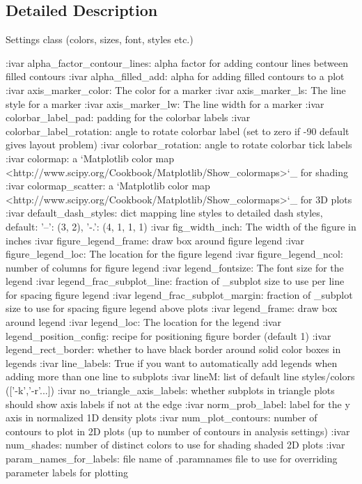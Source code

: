 \subsection{Detailed Description}
\begin{DoxyVerb}Settings class (colors, sizes, font, styles etc.)

:ivar alpha_factor_contour_lines: alpha factor for adding contour lines between filled contours
:ivar alpha_filled_add: alpha for adding filled contours to a plot
:ivar axis_marker_color: The color for a marker
:ivar axis_marker_ls: The line style for a marker
:ivar axis_marker_lw: The line width for a marker
:ivar colorbar_label_pad: padding for the colorbar labels
:ivar colorbar_label_rotation: angle to rotate colorbar label (set to zero if -90 default gives layout problem)
:ivar colorbar_rotation: angle to rotate colorbar tick labels
:ivar colormap: a `Matplotlib color map <http://www.scipy.org/Cookbook/Matplotlib/Show_colormaps>`_ for shading
:ivar colormap_scatter: a `Matplotlib color map <http://www.scipy.org/Cookbook/Matplotlib/Show_colormaps>`_ for 3D plots
:ivar default_dash_styles: dict mapping line styles to detailed dash styles, default:  {'--': (3, 2), '-.': (4, 1, 1, 1)}
:ivar fig_width_inch: The width of the figure in inches
:ivar figure_legend_frame: draw box around figure legend
:ivar figure_legend_loc: The location for the figure legend
:ivar figure_legend_ncol: number of columns for figure legend
:ivar legend_fontsize: The font size for the legend
:ivar legend_frac_subplot_line: fraction of _subplot size to use per line for spacing figure legend
:ivar legend_frac_subplot_margin: fraction of _subplot size to use for spacing figure legend above plots
:ivar legend_frame: draw box around legend
:ivar legend_loc: The location for the legend
:ivar legend_position_config: recipe for positioning figure border (default 1)
:ivar legend_rect_border: whether to have black border around solid color boxes in legends
:ivar line_labels: True if you want to automatically add legends when adding more than one line to subplots
:ivar lineM: list of default line styles/colors (['-k','-r'...])
:ivar no_triangle_axis_labels: whether subplots in triangle plots should show axis labels if not at the edge
:ivar norm_prob_label: label for the y axis in normalized 1D density plots
:ivar num_plot_contours: number of contours to plot in 2D plots (up to number of contours in analysis settings)
:ivar num_shades: number of distinct colors to use for shading shaded 2D plots
:ivar param_names_for_labels: file name of .paramnames file to use for overriding parameter labels for plotting

\end{DoxyVerb}
